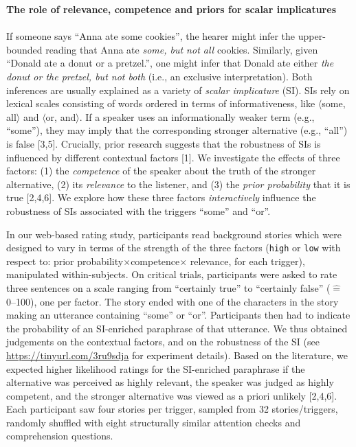 \documentclass[11pt,letterpaper]{article}
\renewcommand{\title}[1]{\textbf{#1}\\}
\newcommand{\authors}[1]{\iftoggle{anonymous}{\phantom{#1}}{#1}\\}
\newcommand{\email}[1]{\iftoggle{anonymous}{\phantom{#1}}{#1}}
\begin{document}


\title{The role of relevance, competence and priors for scalar implicatures}
\authors{Polina Tsvilodub (Osnabr\"uck University, ptsvilodub@uos.de), Bob van Tiel (Radboud University), Michael Franke (University of T\"ubingen)}
If someone says ``Anna ate some cookies'', the hearer might infer the upper-bounded reading that Anna ate \textit{some, but not all} cookies. Similarly, given ``Donald ate a donut or a pretzel.'', one might infer that Donald ate either \textit{the donut or the pretzel, but not both} (i.e., an exclusive interpretation). 
Both inferences are usually explained as a variety of \textit{scalar implicature} (SI). SIs rely on lexical scales consisting of words ordered in terms of informativeness, like $\langle$some, all$\rangle$ and $\langle$or, and$\rangle$. If a speaker uses an informationally weaker term (e.g., ``some''), they may imply that the corresponding stronger alternative (e.g., ``all'') is false [3,5]. %
Crucially, prior research suggests that the robustness of SIs is influenced by different contextual factors [1].
We investigate the effects of three factors: (1) the \textit{competence} of the speaker about the truth of the stronger alternative, (2) its \textit{relevance} to the listener, and (3) the \textit{prior probability} that it is true [2,4,6]. We explore how these three factors \textit{interactively} influence the robustness of SIs associated with the triggers ``some'' and ``or''. 

In our web-based rating study, participants read background stories which were designed to vary in terms of the strength of the three factors (\texttt{high} or \texttt{low} with respect to: prior probability$\times$competence$\times$ relevance, for each trigger), manipulated within-subjects.
On critical trials, participants were asked to rate three sentences on a scale ranging from ``certainly true'' to ``certainly false'' ($\widehat{=}$0--100), one per factor. 
The story ended with one of the characters in the story making an utterance containing ``some'' or ``or''. Participants then had to indicate the probability of an SI-enriched paraphrase of that utterance. 
We thus obtained judgements on the contextual factors, and on the robustness of the SI (see \url{https://tinyurl.com/3ru9sdja} for experiment details). 
Based on the literature, we expected higher likelihood ratings for the SI-enriched paraphrase if the alternative was perceived as highly relevant, the speaker was judged as highly competent, and the stronger alternative was viewed as a priori unlikely [2,4,6]. Each participant saw four stories per trigger, sampled from 32 stories/triggers, randomly shuffled with eight structurally similar attention checks and comprehension questions.
\end{document}
